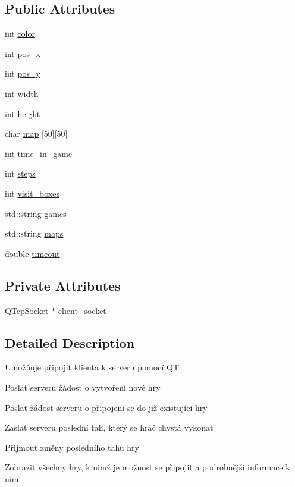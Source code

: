\subsection*{Public Attributes}
\begin{DoxyCompactItemize}
\item 
int \hyperlink{classClient_ac6b50f30a11a753cabccc3f1fad83c82}{color}
\item 
int \hyperlink{classClient_a041ca02ff50a6544895c2e1013d29322}{pos\-\_\-x}
\item 
int \hyperlink{classClient_a1bf641e425b42c642a8be4d289a49229}{pos\-\_\-y}
\item 
int \hyperlink{classClient_aded73ce1e4c2d6a1f05c180956b85966}{width}
\item 
int \hyperlink{classClient_af7d6fce6b2b35773b4222cd8e86a840a}{height}
\item 
char \hyperlink{classClient_a6fcbb886abc984b5a6d590367e84d3f6}{map} \mbox{[}50\mbox{]}\mbox{[}50\mbox{]}
\item 
int \hyperlink{classClient_a8aa8ad037b45ef85ddc9d0b36bbb42b4}{time\-\_\-in\-\_\-game}
\item 
int \hyperlink{classClient_a60ac9a77128bfbcff9ae1dc7564fb441}{steps}
\item 
int \hyperlink{classClient_a70083e906d35591bd5e57612ce7a5786}{visit\-\_\-boxes}
\item 
std\-::string \hyperlink{classClient_aea5a7a7885c3bfd4dce194de2cef1003}{games}
\item 
std\-::string \hyperlink{classClient_a3ff1eaa556e62a485b2119d251d9d2d3}{maps}
\item 
double \hyperlink{classClient_a37ec3a1f75d0ddcf25354b2bc552a039}{timeout}
\end{DoxyCompactItemize}
\subsection*{Private Attributes}
\begin{DoxyCompactItemize}
\item 
Q\-Tcp\-Socket $\ast$ \hyperlink{classClient_aa684011b09c5d68ee677f026b036aaea}{client\-\_\-socket}
\end{DoxyCompactItemize}


\subsection{Detailed Description}
Umožňuje připojit klienta k serveru pomocí Q\-T \par
 Poslat serveru žádost o vytvoření nové hry \par
 Poslat žádost serveru o připojení se do již existující hry \par
 Zaslat serveru poslední tah, který se hráč chystá vykonat\par
 Přijmout změny posledního tahu hry\par
 Zobrazit všechny hry, k nimž je možnost se připojit a podrobnější informace k nim\par
 


